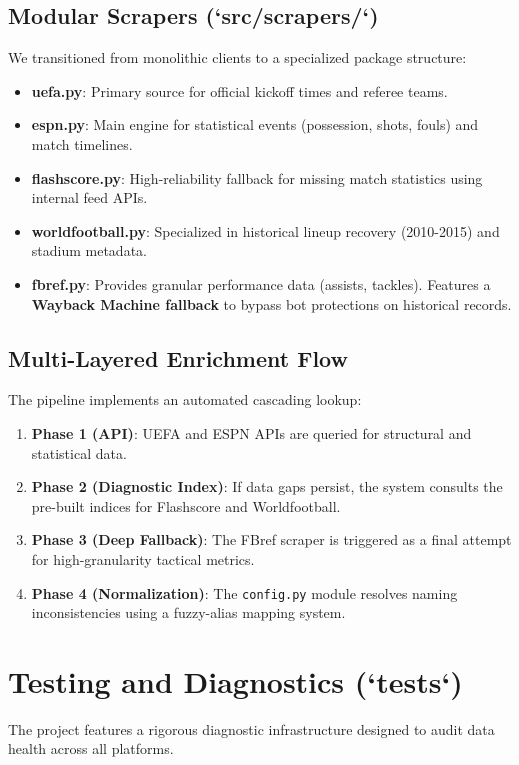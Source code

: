 \documentclass[12pt,a4paper]{article}
\begin{document}
\subsection{Modular Scrapers (`src/scrapers/`)}
We transitioned from monolithic clients to a specialized package structure:
\begin{itemize}
    \item \textbf{uefa.py}: Primary source for official kickoff times and referee teams.
    \item \textbf{espn.py}: Main engine for statistical events (possession, shots, fouls) and match timelines.
    \item \textbf{flashscore.py}: High-reliability fallback for missing match statistics using internal feed APIs.
    \item \textbf{worldfootball.py}: Specialized in historical lineup recovery (2010-2015) and stadium metadata.
    \item \textbf{fbref.py}: Provides granular performance data (assists, tackles). Features a \textbf{Wayback Machine fallback} to bypass bot protections on historical records.
\end{itemize}

\subsection{Multi-Layered Enrichment Flow}
The pipeline implements an automated cascading lookup:
\begin{enumerate}
    \item \textbf{Phase 1 (API)}: UEFA and ESPN APIs are queried for structural and statistical data.
    \item \textbf{Phase 2 (Diagnostic Index)}: If data gaps persist, the system consults the pre-built indices for Flashscore and Worldfootball.
    \item \textbf{Phase 3 (Deep Fallback)}: The FBref scraper is triggered as a final attempt for high-granularity tactical metrics.
    \item \textbf{Phase 4 (Normalization)}: The \texttt{config.py} module resolves naming inconsistencies using a fuzzy-alias mapping system.
\end{enumerate}

\section{Testing and Diagnostics (`tests`)}
The project features a rigorous diagnostic infrastructure designed to audit data health across all platforms.
\end{document}
